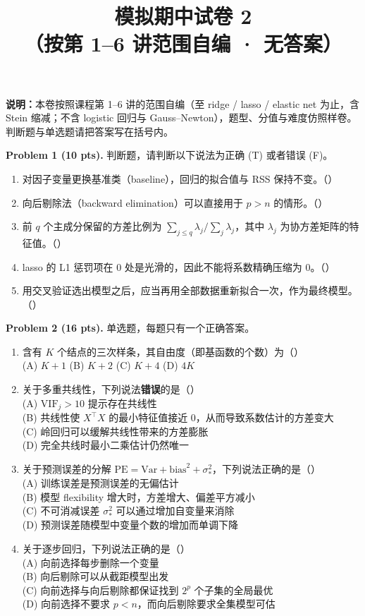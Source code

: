 \documentclass[11pt]{ctexart}
\title{\textbf{模拟期中试卷 2}\\[0.2em]
\large （按第 1--6 讲范围自编 · 无答案）}
\author{}
\date{}
\newcommand{\fillblank}{\mbox{（\qquad）}}
\begin{document}
\maketitle
\vspace{-1.2cm}

\noindent\textbf{说明：}本卷按照课程第 1--6 讲的范围自编（至 ridge / lasso / elastic net 为止，含 Stein 缩减；不含 logistic 回归与 Gauss--Newton），题型、分值与难度仿照样卷。判断题与单选题请把答案写在括号内。

\vspace{0.6em}

\noindent\textbf{Problem 1 (10 pts).} 判断题，请判断以下说法为正确 (T) 或者错误 (F)。
\begin{enumerate}
\item 对因子变量更换基准类（baseline），回归的拟合值与 RSS 保持不变。\fillblank
\item 向后剔除法（backward elimination）可以直接用于 $p > n$ 的情形。\fillblank
\item 前 $q$ 个主成分保留的方差比例为 $\sum_{j \leq q}\lambda_j \big/ \sum_j \lambda_j$，其中 $\lambda_j$ 为协方差矩阵的特征值。\fillblank
\item lasso 的 L1 惩罚项在 $0$ 处是光滑的，因此不能将系数精确压缩为 $0$。\fillblank
\item 用交叉验证选出模型之后，应当再用全部数据重新拟合一次，作为最终模型。\fillblank
\end{enumerate}

\noindent\textbf{Problem 2 (16 pts).} 单选题，每题只有一个正确答案。
\begin{enumerate}
\item 含有 $K$ 个结点的三次样条，其自由度（即基函数的个数）为\fillblank\\
(A) $K+1$\quad
(B) $K+2$\quad
(C) $K+4$\quad
(D) $4K$
\item 关于多重共线性，下列说法\textbf{错误}的是\fillblank\\
(A) $\mathrm{VIF}_j > 10$ 提示存在共线性\\
(B) 共线性使 $X^{\top}X$ 的最小特征值接近 $0$，从而导致系数估计的方差变大\\
(C) 岭回归可以缓解共线性带来的方差膨胀\\
(D) 完全共线时最小二乘估计仍然唯一
\item 关于预测误差的分解 $\mathrm{PE} = \mathrm{Var} + \mathrm{bias}^2 + \sigma_*^2$，下列说法正确的是\fillblank\\
(A) 训练误差是预测误差的无偏估计\\
(B) 模型 flexibility 增大时，方差增大、偏差平方减小\\
(C) 不可消减误差 $\sigma_*^2$ 可以通过增加自变量来消除\\
(D) 预测误差随模型中变量个数的增加而单调下降
\item 关于逐步回归，下列说法正确的是\fillblank\\
(A) 向前选择每步删除一个变量\\
(B) 向后剔除可以从截距模型出发\\
(C) 向前选择与向后剔除都保证找到 $2^p$ 个子集的全局最优\\
(D) 向前选择不要求 $p < n$，而向后剔除要求全集模型可估
\end{enumerate}
\end{document}
